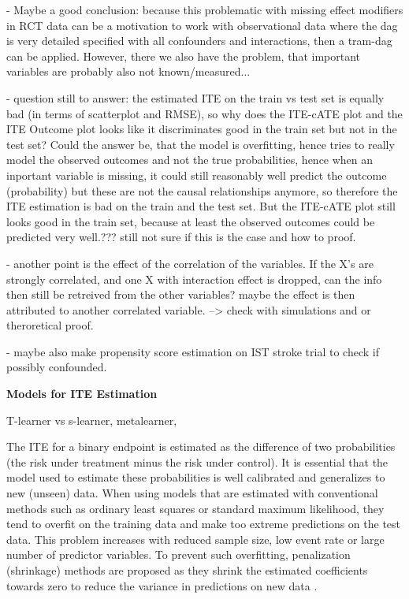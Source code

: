 - Maybe a good conclusion: because this problematic with missing effect modifiers in RCT data can be a motivation to work with observational data where the dag is very detailed specified with all confounders and interactions, then a tram-dag can be applied. However, there we also have the problem, that important variables are probably also not known/measured...

- question still to answer: the estimated ITE on the train vs test set is equally bad (in terms of scatterplot and RMSE), so why does the ITE-cATE plot and the ITE Outcome plot looks like it discriminates good in the train set but not in the test set? Could the answer be, that the model is overfitting, hence tries to really model the observed outcomes and not the true probabilities, hence when an inportant variable is missing, it could still reasonably well predict the outcome (probability) but these are not the causal relationships anymore, so therefore the ITE estimation is bad on the train and the test set. But the ITE-cATE plot still looks good in the train set, because at least the observed outcomes could be predicted very well.??? still not sure if this is the case and how to proof.

- another point is the effect of the correlation of the variables. If the X's are strongly correlated, and one X with interaction effect is dropped, can the info then still be retreived from the other variables? maybe the effect is then attributed to another correlated variable. --> check with simulations and or theroretical proof.


- maybe also make propensity score estimation on IST stroke trial to check if possibly confounded.




\textbf{Models for ITE Estimation}

T-learner vs s-learner, metalearner,

The ITE for a binary endpoint is estimated as the difference of two probabilities (the risk under treatment minus the risk under control). It is essential that the model used to estimate these probabilities is well calibrated and generalizes to new (unseen) data. When using models that are estimated with conventional methods such as ordinary least squares or standard maximum likelihood, they tend to overfit on the training data and make too extreme predictions on the test data. This problem increases with reduced sample size, low event rate or large number of predictor variables. To prevent such overfitting, penalization (shrinkage) methods are proposed as they shrink the estimated coefficients towards zero to reduce the variance in predictions on new data \citep{riley2021}. 


